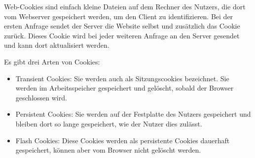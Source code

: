 
Web-Cookies sind einfach kleine Dateien auf dem Rechner des Nutzers, die dort vom Webserver gespeichert werden, um den Client zu identifizieren. Bei der ersten Anfrage sendet der Server die Website selbst und zusätzlich das Cookie zurück. Dieses Cookie wird bei jeder weiteren Anfrage an den Server gesendet und kann dort aktualisiert werden. 

Es gibt drei Arten von Cookies:

\begin{itemize}
    \item Transient Cookies: Sie werden auch als Sitzungscookies bezeichnet. Sie werden im Arbeitsspeicher gespeichert und gelöscht, sobald der Browser geschlossen wird.
    \item Persistent Cookies: Sie werden auf der Festplatte des Nutzers gespeichert und bleiben dort so lange gespeichert, wie der Nutzer dies zulässt.
    \item Flash Cookies: Diese Cookies werden als persistente Cookies dauerhaft gespeichert, können aber vom Browser nicht gelöscht werden. 
\end{itemize}
\cite{w3Cookies}